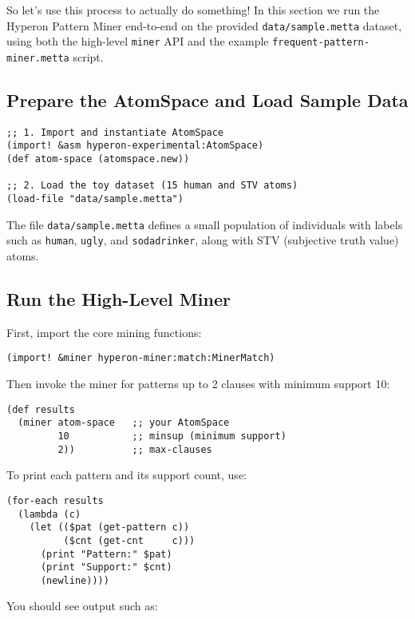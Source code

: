 So let's use this process to actually do something!  In this section we run the Hyperon Pattern Miner end-to-end on the provided \texttt{data/sample.metta} dataset, using both the high-level \texttt{miner} API and the example \texttt{frequent-pattern-miner.metta} script.

\subsection{Prepare the AtomSpace and Load Sample Data}

\begin{verbatim}
;; 1. Import and instantiate AtomSpace
(import! &asm hyperon-experimental:AtomSpace)
(def atom-space (atomspace.new))

;; 2. Load the toy dataset (15 human and STV atoms)
(load-file "data/sample.metta")
\end{verbatim}

The file \texttt{data/sample.metta} defines a small population of individuals with labels such as \texttt{human}, \texttt{ugly}, and \texttt{sodadrinker}, along with STV (subjective truth value) atoms.

\subsection{Run the High-Level Miner}

First, import the core mining functions:

\begin{verbatim}
(import! &miner hyperon-miner:match:MinerMatch)
\end{verbatim}

Then invoke the miner for patterns up to 2 clauses with minimum support 10:

\begin{verbatim}
(def results
  (miner atom-space   ;; your AtomSpace
         10           ;; minsup (minimum support)
         2))          ;; max-clauses
\end{verbatim}

To print each pattern and its support count, use:

\begin{verbatim}
(for-each results
  (lambda (c)
    (let (($pat (get-pattern c))
          ($cnt (get-cnt     c)))
      (print "Pattern:" $pat)
      (print "Support:" $cnt)
      (newline))))
\end{verbatim}

You should see output such as:


